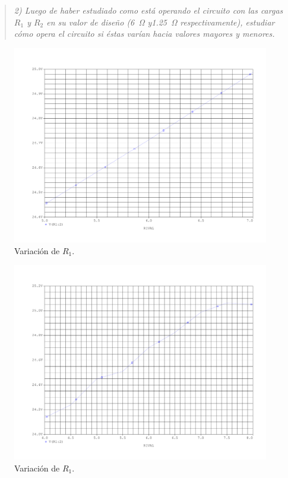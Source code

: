 \begin{quote} \textit{2) Luego de haber estudiado como está operando el circuito con las cargas $R_1$ y $R_2$ en su valor de diseño (\SI{6}{\ohm} y\SI{1.25}{\ohm} respectivamente), estudiar cómo opera el circuito si éstas varían hacia valores mayores y menores.}
\end{quote}


\begin{figure}[H]
	\centering
	\includegraphics[scale=0.5]{Figuras/2_var_R1.pdf}
	\caption{Variación de $R_1$.}
	\label{fig:var_R1}
\end{figure}


\begin{figure}[H]
	\centering
	\includegraphics[scale=0.5]{Figuras/2_var_R1_v2.pdf}
	\caption{Variación de $R_1$.}
	\label{fig:var_R1}
\end{figure}


